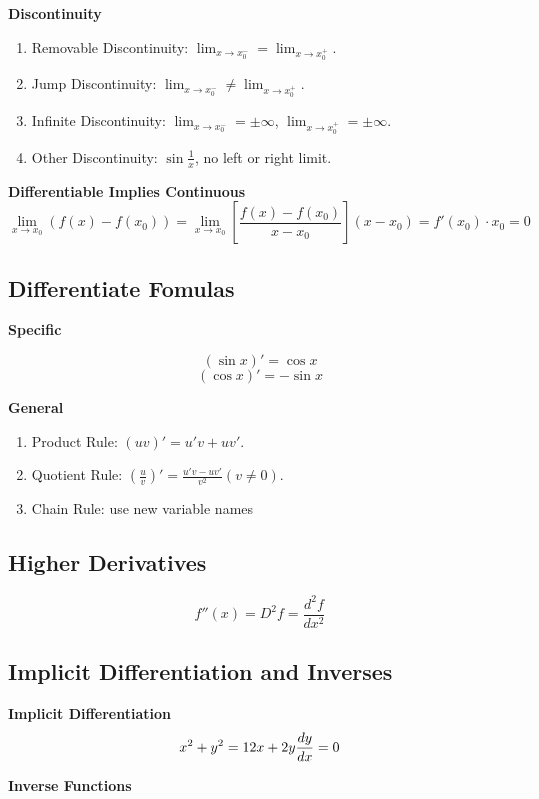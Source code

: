 \documentclass{article}
\newcommand\limitx[1]{\lim_{x \to #1}}
\begin{document}
\textbf{Discontinuity}

\begin{enumerate}
\item Removable Discontinuity: $\limitx{x_0^-} = \limitx{x_0^+}$.
\item Jump Discontinuity: $\limitx{x_0^-} \not= \limitx{x_0^+}$.
\item Infinite Discontinuity: $\limitx{x_0^-} = \pm\infty$, $\limitx{x_0^+} = \pm\infty$.
\item Other Discontinuity: $\sin{\frac{1}{x}}$, no left or right limit.
\end{enumerate}


\textbf{Differentiable Implies Continuous}
$$\limitx{x_0}{(f(x)-f(x_0))} = \limitx{x_0}\left[{\frac{f(x)-f(x_0)}{x-x_0}}\right](x-x_0) = f'(x_0) \cdot x_0 = 0$$

\subsection{Differentiate Fomulas}

\textbf{Specific}

$$(\sin x)' = \cos x$$
$$(\cos x)' = -\sin x$$

\textbf{General}

\begin{enumerate}
\item Product Rule: $(uv)' = u'v + uv'$.
\item Quotient Rule: $(\frac{u}{v})' = \frac{u'v-uv'}{v^2}(v \not= 0)$.
\item Chain Rule: use new variable names
\end{enumerate}

\subsection{Higher Derivatives}
$$f''(x) = D^2f = \frac{d^2f}{dx^2}$$

\subsection{Implicit Differentiation and Inverses}

\textbf{Implicit Differentiation}
\begin{equation*}
x^2 + y^2 = 1 \\
2x + 2y\frac{dy}{dx} = 0
\end{equation*}

\textbf{Inverse Functions}
\end{document}
